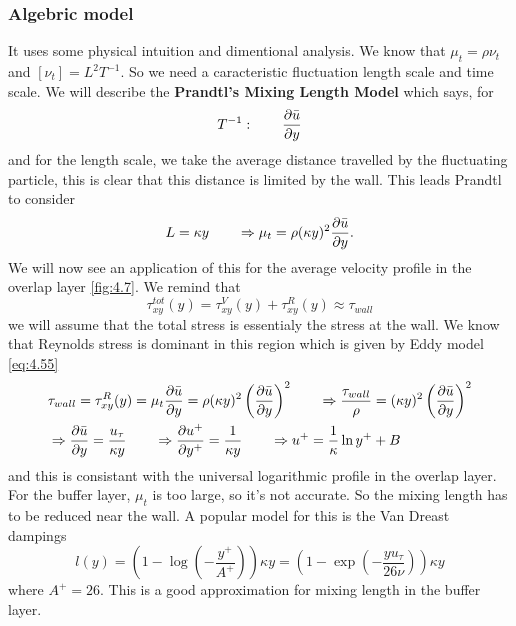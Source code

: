 	\subsubsection{Algebric model}
		It uses some physical intuition and dimentional analysis. We know that $\mu _t = \rho \nu _t$ and $[\nu _t] = L^2T^{-1}$. So we need a caracteristic fluctuation length scale and time scale. We will describe the \textbf{Prandtl’s Mixing Length Model} which says, for
		\begin{equation}
			T^{-1} : \qquad \frac{\partial \bar{u}}{\partial y}
		\end{equation}
		and for the length scale, we take the average distance travelled by the fluctuating particle, this is clear that this distance is limited by the wall. This leads Prandtl to consider 
		\begin{equation}
			L = \kappa y \qquad \Rightarrow \mu _t = \rho (\kappa y)^2 \frac{\partial \bar{u}}{\partial y}.
		\end{equation}
		We will now see an application of this for the average velocity profile in the overlap layer \autoref{fig:4.7}. We remind that 
		\begin{equation}
			\tau _{xy}^{tot} (y) = \tau _{xy}^{V} (y)  + \tau _{xy}^{R} (y) \approx \tau _{wall}
		\end{equation}
		we will assume that the total stress is essentialy the stress at the wall. We know that Reynolds stress is dominant in this region which is given by Eddy model \eqref{eq:4.55}
		\begin{equation}
		\begin{aligned}
			&\tau _{wall} = \tau _{xy}^R (y) = \mu_t \frac{\partial \bar{u}}{\partial y} = \rho (\kappa y)^2 \left(\frac{\partial \bar{u}}{\partial y}\right)^2 \qquad \Rightarrow \frac{\tau _{wall}}{\rho} = (\kappa y)^2 \left(\frac{\partial \bar{u}}{\partial y}\right)^2\\
			&\Rightarrow \frac{\partial \bar{u}}{\partial y} = \frac{u _\tau}{\kappa y} \qquad \Rightarrow \frac{\partial u^+}{\partial y^+} = \frac{1}{\kappa y} \qquad \Rightarrow u^+ = \frac{1}{\kappa}\ln y^+ + B
		\end{aligned}
		\end{equation}
		and this is consistant with the universal logarithmic profile in the overlap layer. For the buffer layer, $\mu _t$ is too large, so it's not accurate. So the mixing length has to be reduced near the wall. A popular model for this is the Van Dreast dampings 
		\begin{equation}
			l(y) = \left( 1 - \log \left( -\frac{y^+}{A^+} \right) \right) \kappa y = \left( 1 - \exp \left( -\frac{yu_\tau}{26 \nu} \right) \right) \kappa y 
		\end{equation}
		where $A^+ = 26$. This is a good approximation for mixing length in the buffer layer. 